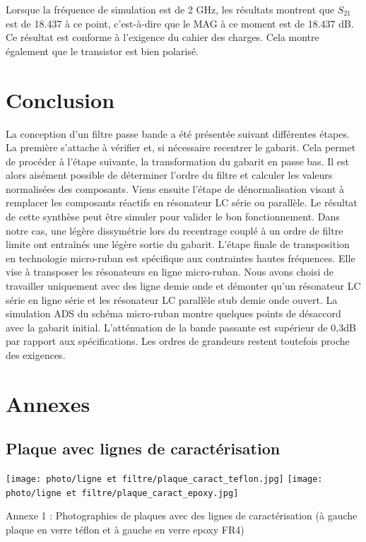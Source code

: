 \documentclass[french]{article}
\begin{document}
Lorsque la fréquence de simulation est de 2 GHz, les résultats montrent que $S_{21}$ est de 18.437 à ce point, c'est-à-dire que le MAG à ce moment est de 18.437 dB. Ce résultat est conforme à l'exigence du cahier des charges. Cela montre également que le transistor est bien polarisé.


\newpage
\section{Conclusion}

La conception d'un filtre passe bande a été présentée suivant différentes étapes. La première s'attache à vérifier et, si nécessaire recentrer le gabarit. Cela permet de procéder à l'étape suivante, la transformation du gabarit en passe bas. Il est alors aisément possible de déterminer l'ordre du filtre et calculer les valeurs normalisées des composants. Viens ensuite l'étape de dénormalisation visant à remplacer les composants réactifs en résonateur LC série ou parallèle. Le résultat de cette synthèse peut être simuler pour valider le bon fonctionnement. Dans notre cas, une légère dissymétrie lors du recentrage couplé à un ordre de filtre limite ont entraînés une légère sortie du gabarit. L'étape finale de transposition en technologie micro-ruban est spécifique aux contraintes hautes fréquences. Elle vise à transposer les résonateurs en ligne micro-ruban. Nous avons choisi de travailler uniquement avec des ligne demie onde et démonter qu'un résonateur LC série en ligne série et les résonateur LC parallèle stub demie onde ouvert. La simulation ADS du schéma micro-ruban montre quelques points de désaccord avec la gabarit initial. L'atténuation de la bande passante est supérieur de 0,3dB par rapport aux spécifications. Les ordres de grandeurs restent toutefois proche des exigences.  



\newpage
\cite{cours_MF} \cite{cours_HF} \cite{data_fr4} \cite{data_PTFE}
{}

\newpage

\section*{Annexes}

\subsection*{Plaque avec lignes de caractérisation}
\texttt{[image: photo/ligne et filtre/plaque\_caract\_teflon.jpg]}
\texttt{[image: photo/ligne et filtre/plaque\_caract\_epoxy.jpg]}
\begin{center}
	Annexe 1 : Photographies de plaques avec des lignes de caractérisation (à gauche plaque en verre téflon et à gauche en verre epoxy FR4)
\end{center}
\end{document}
